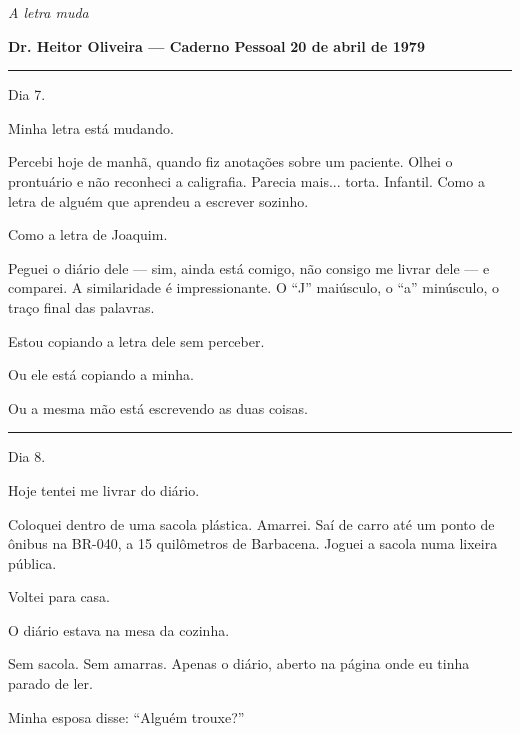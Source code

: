 
\noindent \textit{A letra muda}

\noindent \textbf{Dr. Heitor Oliveira --- Caderno Pessoal}
\textbf{20 de abril de 1979}

\vspace{0.5em}\noindent\rule{\textwidth}{0.5pt}\vspace{0.5em}

\noindent Dia 7.

\noindent Minha letra está mudando.

\noindent Percebi hoje de manhã, quando fiz anotações sobre um paciente. Olhei o prontuário e não reconheci a caligrafia. Parecia mais... torta. Infantil. Como a letra de alguém que aprendeu a escrever sozinho.

\noindent Como a letra de Joaquim.

\noindent Peguei o diário dele --- sim, ainda está comigo, não consigo me livrar dele --- e comparei. A similaridade é impressionante. O \textquotedblleft{}J\textquotedblright{} maiúsculo, o \textquotedblleft{}a\textquotedblright{} minúsculo, o traço final das palavras.

\noindent Estou copiando a letra dele sem perceber.

\noindent Ou ele está copiando a minha.

\noindent Ou a mesma mão está escrevendo as duas coisas.

\vspace{0.5em}\noindent\rule{\textwidth}{0.5pt}\vspace{0.5em}

\noindent Dia 8.

\noindent Hoje tentei me livrar do diário.

\noindent Coloquei dentro de uma sacola plástica. Amarrei. Saí de carro até um ponto de ônibus na BR-040, a 15 quilômetros de Barbacena. Joguei a sacola numa lixeira pública.

\noindent Voltei para casa.

\noindent O diário estava na mesa da cozinha.

\noindent Sem sacola. Sem amarras. Apenas o diário, aberto na página onde eu tinha parado de ler.

\noindent Minha esposa disse: \textquotedblleft{}Alguém trouxe?\textquotedblright{}


